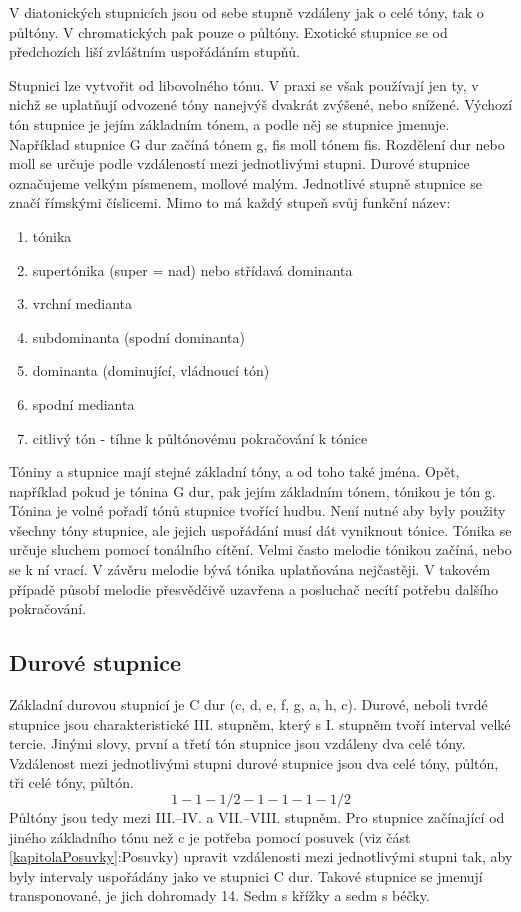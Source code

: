 V diatonických stupnicích jsou od sebe stupně vzdáleny jak o celé tóny, tak o půltóny.
V chromatických pak pouze o půltóny.
Exotické stupnice se od předchozích liší zvláštním uspořádáním stupňů.
\cite{kofron}
\par

Stupnici lze vytvořit od libovolného tónu.
V praxi se však používají jen ty, 
v nichž se uplatňují odvozené tóny nanejvýš dvakrát zvýšené, nebo snížené.
Výchozí tón stupnice je jejím základním tónem, a podle něj se stupnice jmenuje.
Například stupnice G dur začíná tónem g, fis moll tónem fis.
Rozdělení dur nebo moll se určuje podle vzdáleností mezi jednotlivými stupni.
\cite{zenkl}
Durové stupnice označujeme velkým písmenem, mollové malým.
Jednotlivé stupně stupnice se značí římskými číslicemi.
Mimo to má každý stupeň svůj funkční název:
\cite{kofron}

\begin{enumerate} [label=\Roman*]
    \item tónika
    \item supertónika (super = nad) nebo střídavá dominanta
    \item vrchní medianta
    \item subdominanta (spodní dominanta)
    \item dominanta (dominující, vládnoucí tón)
    \item spodní medianta
    \item citlivý tón - tíhne k půltónovému pokračování k tónice
\end{enumerate}
\par

Tóniny a stupnice mají stejné základní tóny, a od toho také jména.
Opět, například pokud je tónina G dur, pak jejím základním tónem, tónikou je tón g.
Tónina je volné pořadí tónů stupnice tvořící hudbu.
Není nutné aby byly použity všechny tóny stupnice, 
ale jejich uspořádání musí dát vyniknout tónice.
Tónika se určuje sluchem pomocí tonálního cítění.
Velmi často melodie tónikou začíná, nebo se k ní vrací.
V závěru melodie bývá tónika uplatňována nejčastěji.
V takovém případě působí melodie přesvědčivě uzavřena 
a posluchač necítí potřebu dalšího pokračování.
\cite{zenkl}
\par

\subsection{Durové stupnice}
Základní durovou stupnicí je C dur (c, d, e, f, g, a, h, c).
Durové, neboli tvrdé stupnice jsou charakteristické III. stupněm,
který s I. stupněm tvoří interval velké tercie.
Jinými slovy, první a třetí tón stupnice jsou vzdáleny dva celé tóny.
Vzdálenost mezi jednotlivými stupni durové stupnice jsou dva celé tóny, 
půltón, tři celé tóny, půltón.
$$ 1 - 1 - 1/2 - 1 - 1 - 1 - 1/2 $$
Půltóny jsou tedy mezi III.--IV. a VII.--VIII. stupněm.
Pro stupnice začínající od jiného základního tónu než c 
je potřeba pomocí posuvek (viz část \ref{kapitolaPosuvky}:Posuvky) 
upravit vzdálenosti mezi jednotlivými stupni tak,
aby byly intervaly uspořádány jako ve stupnici C dur.
Takové stupnice  se jmenují transponované, je jich dohromady 14.
Sedm s křížky a sedm s béčky.
\cite{kofron}
\par

